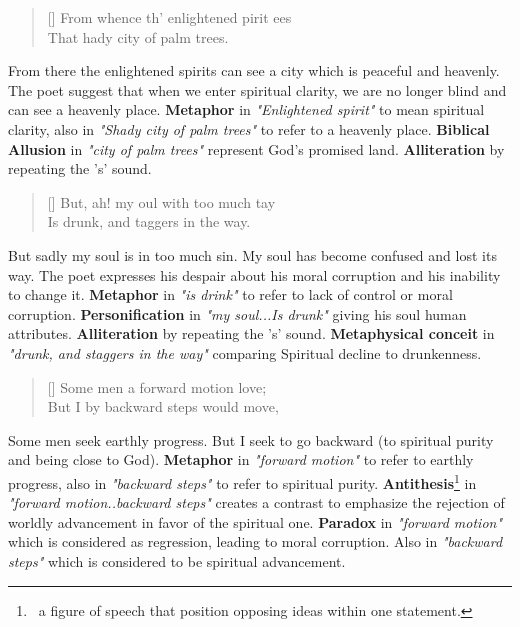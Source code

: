 \documentclass[12pt, a4paper]{article}
\begin{document}
\begin{verse}[\versewidth]
{\fontverse
From whence th’ enlightened pirit ees\\
That hady city of palm trees.
} 
\end{verse}

From there the enlightened spirits can see a city which is peaceful and heavenly.
The poet suggest that when we enter spiritual clarity, we are no longer blind
and can see a heavenly place. \textbf{Metaphor} in \textit{"Enlightened spirit"} 
to mean spiritual clarity, also in \textit{"Shady city of palm trees"} to refer
to a heavenly place. \textbf{Biblical Allusion} in \textit{"city of palm trees"} 
represent God's promised land. \textbf{Alliteration} by repeating the 's' sound.

\begin{verse}[\versewidth]
{\fontverse
But, ah! my oul with too much tay\\
Is drunk, and taggers in the way. 
} 
\end{verse}

But sadly my soul is in too much sin. My soul has become confused 
and lost its way. The poet expresses his despair about his moral corruption
and his inability to change it. \textbf{Metaphor} in \textit{"is drink"} to refer to
lack of control or moral corruption. \textbf{Personification} in \textit{"my soul...Is drunk"} 
giving his soul human attributes. \textbf{Alliteration} by repeating the 's' sound. 
\textbf{Metaphysical conceit} in \textit{"drunk, and staggers in the way"} 
comparing Spiritual decline to drunkenness.



\begin{verse}[\versewidth]
{\fontverse
Some men a forward motion love;\\
But I by backward steps would move,
} 
\end{verse}

Some men seek earthly progress. But I seek to go backward (to spiritual purity
and being close to God). \textbf{Metaphor} in \textit{"forward motion"} 
to refer to earthly progress, also in \textit{"backward steps"} to refer 
to spiritual purity. \textbf{Antithesis}\footnote{\,
a figure of speech that position opposing ideas within one statement.}
in \textit{"forward motion..backward steps"} creates a contrast to emphasize
the rejection of worldly advancement in favor of the spiritual one. \textbf{Paradox} in 
\textit{"forward motion"} which is considered as regression, leading to moral corruption. Also
in \textit{"backward steps"} which is considered to be spiritual advancement.
\end{document}
